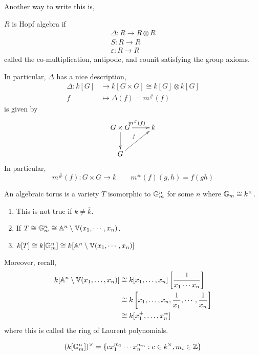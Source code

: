 \documentclass[12pt]{amsart}
\begin{document}
Another way to write this is, 
\begin{definition}
    $R$ is Hopf algebra if 
    \begin{align*}
        \Delta: R \to R \otimes R \\
        S: R \to R \\
        \varepsilon: R \to R
    \end{align*}
    called the co-multiplication, antipode, and counit satisfying the group axioms. 
\end{definition}

In particular, $\Delta$ has a nice description,
\begin{align*}
    \Delta: k[G] &\to k[G \times G] \cong k[G] \otimes k[G] \\
    f &\mapsto \Delta(f) = m^\#(f)
\end{align*}
is given by 
\[ \xymatrix{ G \times G \ar[d] \ar[r]^{m^\#(f)}& k \\ G \ar[ur]^f }\]
In particular, 
\[ m^\#(f): G \times G \to k \qquad m^\#(f)(g,h) = f(gh)\]

\begin{definition}
    An algebraic torus is a variety $T$ isomorphic to $\mathbb G_m^n$ for some $n$ where $\mathbb G_m \cong k^\times$. 
\end{definition}

\begin{remark}
    \begin{enumerate}
        \item This is not true if $k \neq \overline{k}$. 
        \item If $T \cong \mathbb G_m^n \cong \mathbb A^n \setminus \mathbb V(x_1, \cdots, x_n)$.
        \item $k[T] \cong k[\mathbb G_m^n] \cong k[\mathbb A^n\setminus \mathbb V(x_1, \cdots, x_n)]$
    \end{enumerate}
    Moreover, recall, 
    \begin{align*}
        k[\mathbb A^n \setminus \mathbb V(x_1, \ldots, x_n)] &\cong k[x_1, \ldots, x_n]\left[\frac{1}{x_1\cdots x_n}\right] \\
        &\cong k\left[x_1, \ldots, x_n, \frac{1}{x_1}, \cdots, \frac{1}{x_n}\right] \\
        &\cong k[x_1^\pm, \ldots, x_n^\pm]
    \end{align*}
    where this is called the ring of Laurent polynomials.
\end{remark}


\begin{lemma}
    \[(k[\mathbb G_m^n])^\times = \{ cx_1^{m_1} \cdots x_n^{m_n} : c \in k^\times, m_i \in \mathbb Z\}\]
\end{lemma}
\end{document}
